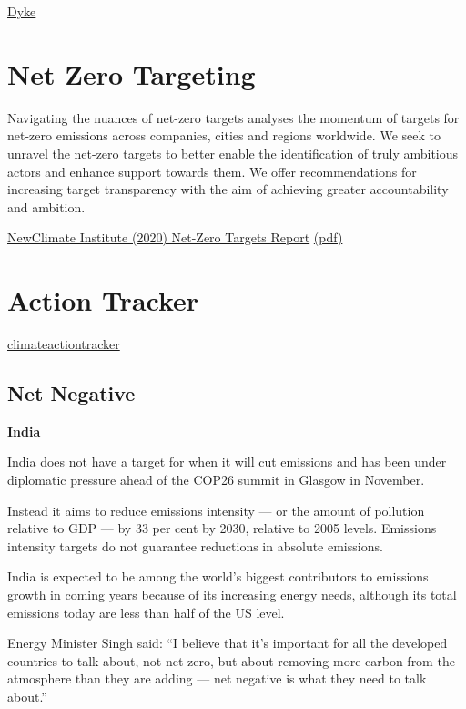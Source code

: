 \documentclass[
]{book}
\begin{document}
\href{https://theconversation.com/climate-scientists-concept-of-net-zero-is-a-dangerous-trap-157368}{Dyke}

\hypertarget{net-zero-targeting}{%
\section{Net Zero Targeting}\label{net-zero-targeting}}

Navigating the nuances of net-zero targets
analyses the momentum of targets for net-zero
emissions across companies, cities and regions
worldwide. We seek to unravel the net-zero
targets to better enable the identification of truly
ambitious actors and enhance support towards
them. We offer recommendations for increasing
target transparency with the aim of achieving
greater accountability and ambition.

\href{https://newclimate.org/2020/10/22/navigating-the-nuances-of-net-zero-targets/}{NewClimate Institute (2020) Net-Zero Targets Report}
\href{pdf/NewClimate_NetZeroReport_October2020.pdf}{(pdf)}

\hypertarget{action-tracker}{%
\section{Action Tracker}\label{action-tracker}}

\href{https://climateactiontracker.org/}{climateactiontracker}

\hypertarget{net-negative-1}{%
\subsection{Net Negative}\label{net-negative-1}}

\textbf{India}

India does not have a target for when it will cut emissions and has been under diplomatic pressure ahead of the COP26 summit in Glasgow in November.

Instead it aims to reduce emissions intensity --- or the amount of pollution relative to GDP --- by 33 per cent by 2030, relative to 2005 levels. Emissions intensity targets do not guarantee reductions in absolute emissions.

India is expected to be among the world's biggest contributors to emissions growth in coming years because of its increasing energy needs, although its total emissions today are less than half of the US level.

Energy Minister Singh said: ``I believe that it's important for all the developed countries to talk about, not net zero, but about removing more carbon from the atmosphere than they are adding --- net negative is what they need to talk about.''
\end{document}
